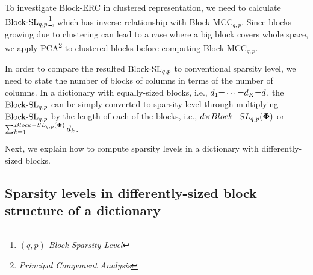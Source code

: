 To investigate Block-ERC in clustered representation, we need to calculate $\mathrm{Block\text{{-}}SL}_{q,p}$\footnote{\emph{$(q,p)$-Block-Sparsity Level}}, which has inverse relationship with Block-MCC$_{q,p}$.
Since blocks growing due to clustering can lead to a case where a big block covers whole space, we apply PCA\footnote{\emph{Principal Component Analysis}} to clustered blocks before computing Block-MCC$_{q,p}$.

In order to compare the resulted $\mathrm{Block\text{{-}}SL}_{q,p}$ to conventional sparsity level, we need to state the number of blocks of columns in terms of the number of columns.
In a dictionary with equally-sized blocks, i.e., $d_1 {=} \cdots {=} d_K {=} d$, the $\mathrm{Block\text{{-}}SL}_{q,p}$ can be simply converted to sparsity level through multiplying $\mathrm{Block\text{{-}}SL}_{q,p}$ by the length of each of the blocks, i.e., $d {\times} Block{-}SL_{q,p}(\boldsymbol{\Phi})$ or $\sum_{k {=} 1}^{Block{-}SL_{q,p}(\boldsymbol{\Phi})} d_k$.

Next, we explain how to compute sparsity levels in a dictionary with differently-sized blocks.
\subsection{Sparsity levels in differently-sized block structure of a dictionary}
\label{sec:SLs} 
